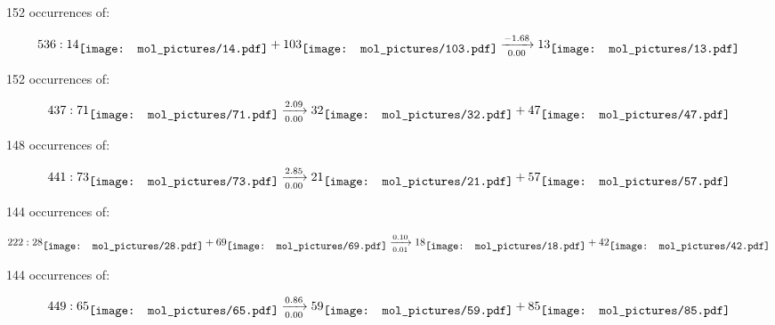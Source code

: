 \documentclass{article}
\begin{document}
\vspace{1cm}


152 occurrences of:

$$
536:  
14
\raisebox{-.5\height}{\texttt{[image: mol\_pictures/14.pdf]}}
+
103
\raisebox{-.5\height}{\texttt{[image: mol\_pictures/103.pdf]}}
\xrightarrow[0.00]{-1.68}
13
\raisebox{-.5\height}{\texttt{[image: mol\_pictures/13.pdf]}}
$$



\vspace{1cm}


152 occurrences of:

$$
437:  
71
\raisebox{-.5\height}{\texttt{[image: mol\_pictures/71.pdf]}}
\xrightarrow[0.00]{2.09}
32
\raisebox{-.5\height}{\texttt{[image: mol\_pictures/32.pdf]}}
+
47
\raisebox{-.5\height}{\texttt{[image: mol\_pictures/47.pdf]}}
$$



\vspace{1cm}


148 occurrences of:

$$
441:  
73
\raisebox{-.5\height}{\texttt{[image: mol\_pictures/73.pdf]}}
\xrightarrow[0.00]{2.85}
21
\raisebox{-.5\height}{\texttt{[image: mol\_pictures/21.pdf]}}
+
57
\raisebox{-.5\height}{\texttt{[image: mol\_pictures/57.pdf]}}
$$



\vspace{1cm}


144 occurrences of:

$$
222:  
28
\raisebox{-.5\height}{\texttt{[image: mol\_pictures/28.pdf]}}
+
69
\raisebox{-.5\height}{\texttt{[image: mol\_pictures/69.pdf]}}
\xrightarrow[0.01]{0.10}
18
\raisebox{-.5\height}{\texttt{[image: mol\_pictures/18.pdf]}}
+
42
\raisebox{-.5\height}{\texttt{[image: mol\_pictures/42.pdf]}}
$$



\vspace{1cm}


144 occurrences of:

$$
449:  
65
\raisebox{-.5\height}{\texttt{[image: mol\_pictures/65.pdf]}}
\xrightarrow[0.00]{0.86}
59
\raisebox{-.5\height}{\texttt{[image: mol\_pictures/59.pdf]}}
+
85
\raisebox{-.5\height}{\texttt{[image: mol\_pictures/85.pdf]}}
$$
\end{document}
